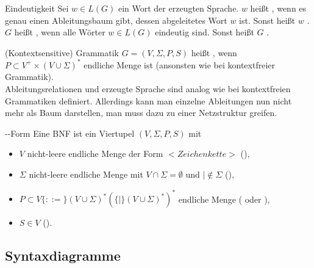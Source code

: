 \begin{Def}{Eindeutigkeit}
    Sei $w \in L(G)$ ein Wort der erzeugten Sprache.
    $w$ heißt , wenn es genau einen Ableitungsbaum gibt,
    dessen abgeleitetes Wort $w$ ist.
    Sonst heißt $w$ . \\
    $G$ heißt , wenn alle Wörter $w \in L(G)$ eindeutig
    sind.
    Sonst heißt $G$ .
\end{Def}

\begin{Def}{(Kontextsensitive) Grammatik}
    $G = (V, \Sigma, P, S)$ heißt , wenn \\
    $P \subset V^+ \times (V \cup \Sigma)^\ast$ endliche Menge ist
    (ansonsten wie bei kontextfreier Grammatik). \\
    Ableitungsrelationen und erzeugte Sprache sind analog wie bei
    kontextfreien Grammatiken definiert.
    Allerdings kann man einzelne Ableitungen nun nicht mehr als Baum
    darstellen, man muss dazu zu einer Netzstruktur greifen.
\end{Def}

\begin{Def}{--Form}
    Eine BNF ist ein Viertupel $(V, \Sigma, P, S)$ mit
    \begin{itemize}
        \item $V$ nicht-leere endliche Menge der Form
        $<\!\!Zeichenkette\!\!>$ (),

        \item $\Sigma$ nicht-leere endliche Menge mit
        $V \cap \Sigma = \emptyset$ und $| \notin \Sigma$
        (),

        \item $P \subset V \{::=\}
        (V \cup \Sigma)^\ast (\{|\} (V \cup \Sigma)^\ast)^\ast$
        endliche Menge ( oder ),

        \item $S \in V$ ().
    \end{itemize}
\end{Def}

\subsection{%
    Syntaxdiagramme%
}

